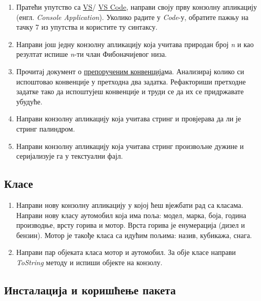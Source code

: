 \documentclass[11pt,a4paper]{article}
\begin{document}
\begin{enumerate}
\def\labelenumi{\arabic{enumi}.}
\item
  Пратећи упутство са
  \href{https://learn.microsoft.com/en-us/previous-versions/visualstudio/visual-studio-2015/ide/creating-solutions-and-projects?view=vs-2015\#create-a-project-from-an-installed-project-template}{VS}/
  \href{https://docs.microsoft.com/en-us/dotnet/core/tutorials/with-visual-studio-code?pivots=dotnet-6-0\#create-the-app}{VS
  Code}, направи своју прву конзолну апликацију (енгл. \emph{Console
  Application}). Уколико радите у \emph{Code}-у, обратите пажњу на тачку
  7 из упутства и користите ту синтаксу.
\item
  Направи још једну конзолну апликацију која учитава природан број
  \emph{n} и као резултат испише \emph{n}-ти члан Фибоначијевог низа.
\item
  Прочитај документ о
  \href{https://docs.microsoft.com/en-us/dotnet/csharp/fundamentals/coding-style/coding-conventions}{препорученим
  конвенција}ма. Анализирај колико си испоштовао конвенције у претходна
  два задатка. Рефакториши претходне задатке тако да испоштујеш
  конвенције и труди се да их се придржавате убудуће.
\item
  Направи конзолну апликацију која учитава стринг и провјерава да ли је
  стринг палиндром.
\item
  Направи конзолну апликацију која учитава стринг произвољне дужине и
  серијализује га у текстуални фајл.
\end{enumerate}

\subsection{Класе}

\begin{enumerate}
\def\labelenumi{\arabic{enumi}.}
\setcounter{enumi}{5}
\item
  Направи нову конзолну апликацију у којој ћеш вјежбати рад са класама.
  Направи нову класу аутомобил која има поља: модел, марка, боја, година
  производње, врсту горива и мотор. Врста горива је енумерација (дизел и
  бензин). Мотор је такође класа са идућим пољима: назив, кубикажа,
  снага.
\item
  Направи пар објеката класа мотор и аутомобил. За обје класе направи
  \emph{ToString} методу и испиши објекте на конзолу.
\end{enumerate}

\subsection{Инсталација и коришћење
пакета}
\end{document}

